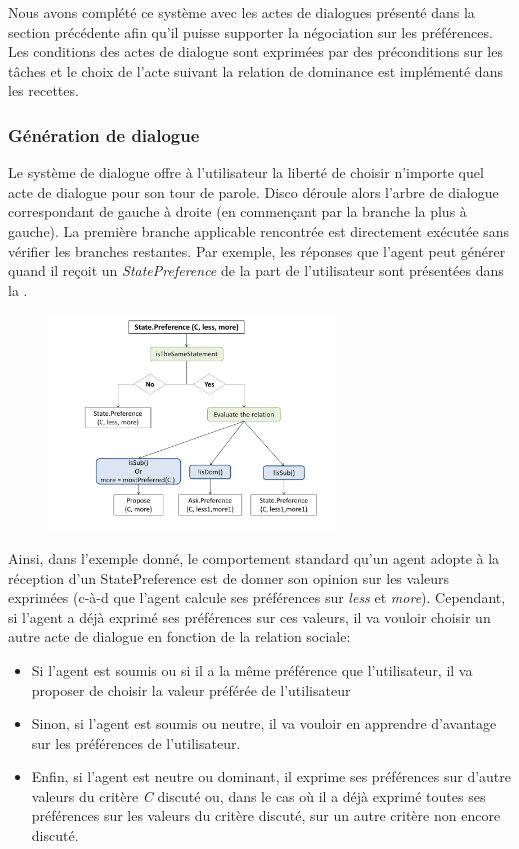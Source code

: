 \documentclass [french]{sig-alternate-05-2015}
\begin{document}
Nous avons complété ce système avec les actes de dialogues présenté dans la section précédente afin qu'il puisse supporter la négociation sur les préférences. Les conditions des actes de dialogue sont exprimées par des préconditions sur les tâches et le choix de l'acte suivant la relation de dominance est implémenté dans les recettes.

\subsubsection{Génération de dialogue} 
 \par Le système de dialogue offre à l'utilisateur la liberté de choisir n'importe quel acte de dialogue pour son tour de parole. Disco déroule alors l'arbre de dialogue correspondant de gauche à droite (en commençant par la branche la plus à gauche). La première branche applicable rencontrée est directement exécutée sans vérifier les branches restantes.
 Par exemple, les réponses que l'agent peut générer quand il reçoit un \emph{StatePreference} de la part de l'utilisateur sont présentées dans la .

 \begin{figure} [h]
 	\centerline{\includegraphics[width=3in]{figs/statePref.pdf}}
	\vskip 8pt
 \end{figure}

Ainsi, dans l'exemple donné, le comportement standard qu'un agent adopte à la réception d'un StatePreference est de donner son opinion sur les valeurs exprimées (c-à-d que l'agent calcule ses préférences sur \textit{less} et \textit{more}). Cependant, si l'agent a déjà exprimé ses préférences sur ces valeurs, il va vouloir choisir un autre acte de dialogue en fonction de la relation sociale:
 \begin{itemize}
 	\item Si l'agent est soumis ou si il a la même préférence que l'utilisateur, il va proposer de choisir la valeur préférée de l'utilisateur
 	\item Sinon, si l'agent est soumis ou neutre, il va vouloir en apprendre d'avantage sur  les préférences de l'utilisateur.
 	\item Enfin, si l'agent est neutre ou dominant, il exprime ses préférences sur d'autre valeurs du critère \emph{C} discuté ou, dans le cas où il a déjà exprimé toutes ses préférences sur les valeurs du critère discuté, sur un autre critère non encore discuté.
 \end{itemize}
 
\end{document}

